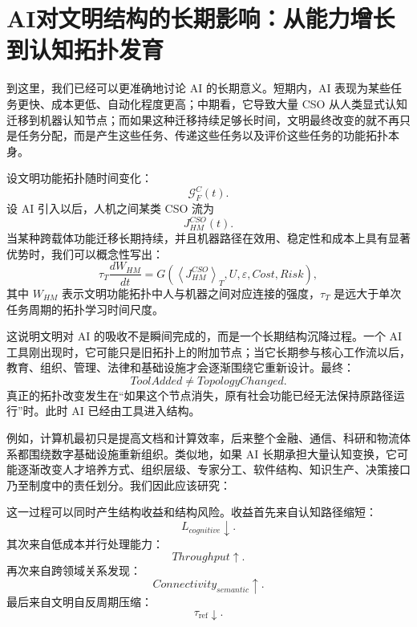 \section{AI对文明结构的长期影响：从能力增长到认知拓扑发育}

到这里，我们已经可以更准确地讨论 AI 的长期意义。短期内，AI 表现为某些任务更快、成本更低、自动化程度更高；中期看，它导致大量 CSO 从人类显式认知迁移到机器认知节点；而如果这种迁移持续足够长时间，文明最终改变的就不再只是任务分配，而是产生这些任务、传递这些任务以及评价这些任务的功能拓扑本身。

设文明功能拓扑随时间变化：
\begin{equation}
\mathcal{G}^{C}_{F}(t).
\end{equation}
设 AI 引入以后，人机之间某类 CSO 流为
\begin{equation}
J_{HM}^{CSO}(t).
\end{equation}
当某种跨载体功能迁移长期持续，并且机器路径在效用、稳定性和成本上具有显著优势时，我们可以概念性写出：
\begin{equation}
\tau_T
\frac{dW_{HM}}{dt}
=
G
\left(
\left\langle
J_{HM}^{CSO}
\right\rangle_T,
U,
\varepsilon,
Cost,
Risk
\right),
\end{equation}
其中 $W_{HM}$ 表示文明功能拓扑中人与机器之间对应连接的强度，$\tau_T$ 是远大于单次任务周期的拓扑学习时间尺度。

这说明文明对 AI 的吸收不是瞬间完成的，而是一个长期结构沉降过程。一个 AI 工具刚出现时，它可能只是旧拓扑上的附加节点；当它长期参与核心工作流以后，教育、组织、管理、法律和基础设施才会逐渐围绕它重新设计。最终：
\begin{equation}
ToolAdded
\neq
TopologyChanged.
\end{equation}
真正的拓扑改变发生在“如果这个节点消失，原有社会功能已经无法保持原路径运行”时。此时 AI 已经由工具进入结构。

例如，计算机最初只是提高文档和计算效率，后来整个金融、通信、科研和物流体系都围绕数字基础设施重新组织。类似地，如果 AI 长期承担大量认知变换，它可能逐渐改变人才培养方式、组织层级、专家分工、软件结构、知识生产、决策接口乃至制度中的责任划分。我们因此应该研究：
\begin{statementbox}
\centering
{}
\end{statementbox}

这一过程可以同时产生结构收益和结构风险。收益首先来自认知路径缩短：
\begin{equation}
L_{cognitive}
\downarrow.
\end{equation}
其次来自低成本并行处理能力：
\begin{equation}
Throughput
\uparrow.
\end{equation}
再次来自跨领域关系发现：
\begin{equation}
Connectivity_{semantic}
\uparrow.
\end{equation}
最后来自文明自反周期压缩：
\begin{equation}
\tau_{\mathrm{ref}}
\downarrow.
\end{equation}

